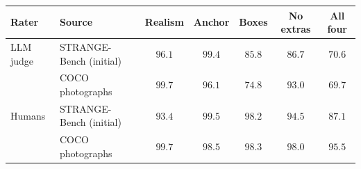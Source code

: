 \begin{tabular}{@{}llccccc@{}}
\toprule
Rater & Source & Realism & Anchor & Boxes & No extras & All four \\
\midrule
LLM judge & STRANGE-Bench (initial) & $96.1$ & $99.4$ & $85.8$ & $86.7$ & $70.6$ \\
 & COCO photographs & $99.7$ & $96.1$ & $74.8$ & $93.0$ & $69.7$ \\
\midrule
Humans & STRANGE-Bench (initial) & $93.4$ & $99.5$ & $98.2$ & $94.5$ & $87.1$ \\
 & COCO photographs & $99.7$ & $98.5$ & $98.3$ & $98.0$ & $95.5$ \\
\bottomrule
\end{tabular}
